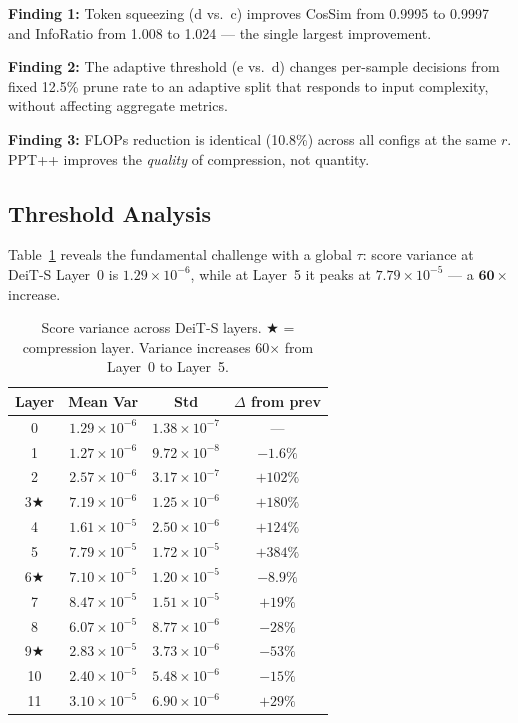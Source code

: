 \documentclass[10pt,twocolumn,letterpaper]{article}
\begin{document}
\textbf{Finding 1:} Token squeezing (d vs.\ c) improves CosSim from 0.9995 to
0.9997 and InfoRatio from 1.008 to 1.024 --- the single largest improvement.

\textbf{Finding 2:} The adaptive threshold (e vs.\ d) changes per-sample
decisions from fixed 12.5\% prune rate to an adaptive split that responds to
input complexity, without affecting aggregate metrics.

\textbf{Finding 3:} FLOPs reduction is identical (10.8\%) across all configs
at the same $r$. PPT++ improves the \textit{quality} of compression, not quantity.


\subsection{Threshold Analysis}

Table~\ref{tab:variance} reveals the fundamental challenge with a global $\tau$:
score variance at DeiT-S Layer~0 is $1.29 \times 10^{-6}$, while at Layer~5
it peaks at $7.79 \times 10^{-5}$ --- a $\mathbf{60\times}$ increase.

\begin{table}[t]
\centering
\caption{Score variance across DeiT-S layers. ★ = compression layer.
Variance increases 60$\times$ from Layer~0 to Layer~5.}
\label{tab:variance}
\small
\begin{tabular}{cccc}
\toprule
\textbf{Layer} & \textbf{Mean Var} & \textbf{Std} & \textbf{$\Delta$ from prev} \\
\midrule
0 & $1.29 \times 10^{-6}$ & $1.38 \times 10^{-7}$ & --- \\
1 & $1.27 \times 10^{-6}$ & $9.72 \times 10^{-8}$ & $-1.6\%$ \\
2 & $2.57 \times 10^{-6}$ & $3.17 \times 10^{-7}$ & $+102\%$ \\
3★ & $7.19 \times 10^{-6}$ & $1.25 \times 10^{-6}$ & $+180\%$ \\
4 & $1.61 \times 10^{-5}$ & $2.50 \times 10^{-6}$ & $+124\%$ \\
5 & $7.79 \times 10^{-5}$ & $1.72 \times 10^{-5}$ & $+384\%$ \\
6★ & $7.10 \times 10^{-5}$ & $1.20 \times 10^{-5}$ & $-8.9\%$ \\
7 & $8.47 \times 10^{-5}$ & $1.51 \times 10^{-5}$ & $+19\%$ \\
8 & $6.07 \times 10^{-5}$ & $8.77 \times 10^{-6}$ & $-28\%$ \\
9★ & $2.83 \times 10^{-5}$ & $3.73 \times 10^{-6}$ & $-53\%$ \\
10 & $2.40 \times 10^{-5}$ & $5.48 \times 10^{-6}$ & $-15\%$ \\
11 & $3.10 \times 10^{-5}$ & $6.90 \times 10^{-6}$ & $+29\%$ \\
\bottomrule
\end{tabular}
\end{table}
\end{document}
